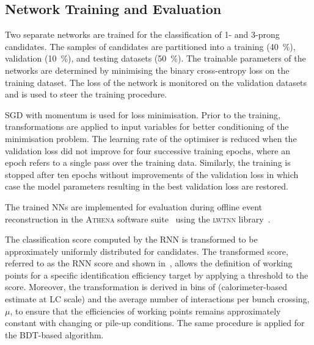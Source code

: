 \subsection{Network Training and Evaluation}

Two separate networks are trained for the classification of 1- and
3-prong \tauhadvis candidates. The samples of \tauhadvis candidates
are partitioned into a training (\SI{40}{\percent}), validation
(\SI{10}{\percent}), and testing datasets (\SI{50}{\percent}). The
trainable parameters of the networks are determined by minimising the
binary cross-entropy loss on the training dataset. The loss of the
network is monitored on the validation datasets and is used to steer
the training procedure.

SGD with momentum is used for loss minimisation. Prior to the training,
transformations are applied to input variables for better conditioning of the
minimisation problem. The learning rate of the optimiser is reduced when the
validation loss did not improve for four successive training epochs, where an
epoch refers to a single pass over the training data. Similarly, the training is
stopped after ten epochs without improvements of the validation loss in which
case the model parameters resulting in the best validation loss are restored.

The trained NNs are implemented for evaluation during offline
event reconstruction in the \textsc{Athena} software
suite~\cite{ATL-SOFT-PUB-2021-001} using the \textsc{lwtnn}
library~\cite{lwtnn}.

The classification score computed by the RNN \tauid is transformed to
be approximately uniformly distributed for \truetauhadvis
candidates. The transformed score, referred to as the RNN score and
shown in~, allows the definition of working
points for a specific \truetauhadvisC identification efficiency target by
applying a threshold to the score. Moreover, the transformation is
derived in bins of \tauhadvis \pT (calorimeter-based \pT estimate at
LC scale) and the average number of interactions per bunch crossing,
$\mu$, to ensure that the \truetauhadvisC efficiencies of working
points remains approximately constant with changing \tauhadvis \pT or
pile-up conditions. The same procedure is applied for the BDT-based
\tauid algorithm.

